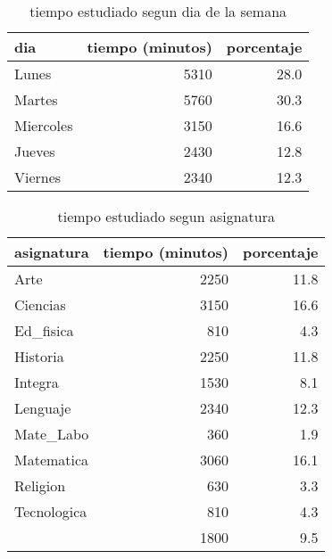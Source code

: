 \documentclass[spanish]{article}
\begin{document}
\begin{table}[h!]
\begin{center}
\begin{tabular}{|l|r|r|}
\hline
dia       & tiempo (minutos) & porcentaje   \\ \hline
Lunes     &             5310 &          28.0\\ \hline
Martes    &             5760 &          30.3\\ \hline
Miercoles &             3150 &          16.6\\ \hline
Jueves    &             2430 &          12.8\\ \hline
Viernes   &             2340 &          12.3\\ \hline
\end{tabular}
\caption{tiempo estudiado segun dia de la semana}
\end{center}
\end{table}

\begin{table}[h!]
\begin{center}
\begin{tabular}{|l|r|r|}
\hline
asignatura  & tiempo (minutos) & porcentaje   \\ \hline
Arte        &             2250 &          11.8\\ \hline
Ciencias    &             3150 &          16.6\\ \hline
Ed\_fisica   &              810 &           4.3\\ \hline
Historia    &             2250 &          11.8\\ \hline
Integra     &             1530 &           8.1\\ \hline
Lenguaje    &             2340 &          12.3\\ \hline
Mate\_Labo   &              360 &           1.9\\ \hline
Matematica  &             3060 &          16.1\\ \hline
Religion    &              630 &           3.3\\ \hline
Tecnologica &              810 &           4.3\\ \hline
            &             1800 &           9.5\\ \hline
\end{tabular}
\caption{tiempo estudiado segun asignatura}
\end{center}
\end{table}
\end{document}
